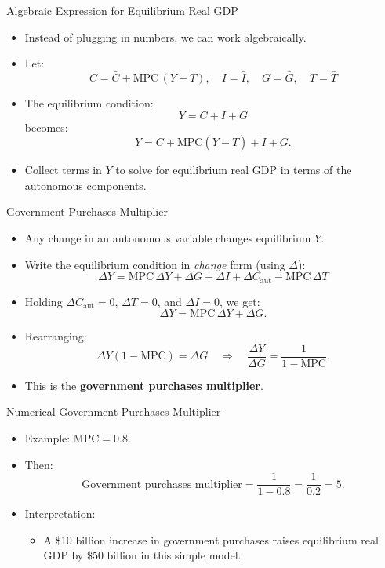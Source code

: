 \documentclass[aspectratio=169]{beamer}
\begin{document}
\begin{frame}{Algebraic Expression for Equilibrium Real GDP}
\transfade
\begin{itemize}[<+->]
  \item Instead of plugging in numbers, we can work algebraically.
  \item Let:
  \[
    C = \bar{C} + \text{MPC}\,(Y - T), \quad
    I = \bar{I}, \quad
    G = \bar{G}, \quad
    T = \bar{T}
  \]
  \item The equilibrium condition:
  \[
    Y = C + I + G
  \]
  becomes:
  \[
    Y = \bar{C} + \text{MPC}(Y - \bar{T}) + \bar{I} + \bar{G}.
  \]
  \item Collect terms in \(Y\) to solve for equilibrium real GDP in terms of the autonomous components.
\end{itemize}
\end{frame}

\begin{frame}{Government Purchases Multiplier}
\transfade
\begin{itemize}[<+->]
  \item Any change in an autonomous variable changes equilibrium \(Y\).
  \item Write the equilibrium condition in \emph{change} form (using \(\Delta\)):
  \[
    \Delta Y = \text{MPC} \,\Delta Y + \Delta G + \Delta I + \Delta C_{\text{aut}} - \text{MPC}\,\Delta T
  \]
  \item Holding \(\Delta C_{\text{aut}} = 0\), \(\Delta T = 0\), and \(\Delta I = 0\), we get:
  \[
    \Delta Y = \text{MPC} \,\Delta Y + \Delta G.
  \]
  \item Rearranging:
  \[
    \Delta Y (1 - \text{MPC}) = \Delta G
    \quad \Rightarrow \quad
    \frac{\Delta Y}{\Delta G} = \frac{1}{1 - \text{MPC}}.
  \]
  \item This is the \textbf{government purchases multiplier}.
\end{itemize}
\end{frame}

\begin{frame}{Numerical Government Purchases Multiplier}
\transfade
\begin{itemize}[<+->]
  \item Example: \(\text{MPC} = 0.8\).
  \item Then:
  \[
    \text{Government purchases multiplier}
      = \frac{1}{1 - 0.8} = \frac{1}{0.2} = 5.
  \]
  \item Interpretation:
  \begin{itemize}[<+->]
    \item A \$10 billion increase in government purchases raises equilibrium real GDP by \(\$50\) billion in this simple model.
  \end{itemize}
\end{itemize}
\end{frame}
\end{document}
